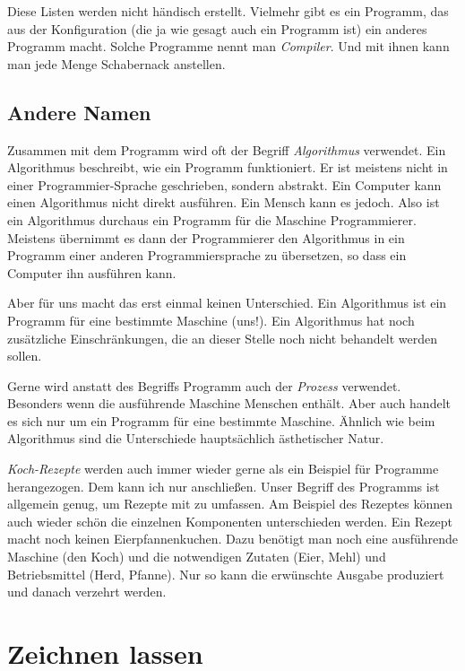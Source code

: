 \documentclass[a5paper,ngerman,9pt]{article}
\begin{document}
\begin{multicols}{2}
	Diese Listen werden nicht händisch erstellt.
	Vielmehr gibt es ein Programm, das aus der Konfiguration (die ja wie
	gesagt auch ein Programm ist) ein anderes Programm macht.
	Solche Programme nennt man \emph{Compiler}.
	Und mit ihnen kann man jede Menge Schabernack anstellen.

	\subsection{Andere Namen}

	Zusammen mit dem Programm wird oft der Begriff \emph{Algorithmus}
	verwendet.
	Ein Algorithmus beschreibt, wie ein Programm funktioniert.
	Er ist meistens nicht in einer Programmier-Sprache geschrieben,
	sondern abstrakt.
	Ein Computer kann einen Algorithmus nicht direkt ausführen.
	Ein Mensch kann es jedoch.
	Also ist ein Algorithmus durchaus ein Programm für die Maschine
	Programmierer.
	Meistens übernimmt es dann der Programmierer den Algorithmus in
	ein Programm einer anderen Programmiersprache zu übersetzen, so dass
	ein Computer ihn ausführen kann.

	Aber für uns macht das erst einmal keinen Unterschied.
	Ein Algorithmus ist ein Programm für eine bestimmte Maschine (uns!).
	Ein Algorithmus hat noch zusätzliche Einschränkungen, die an dieser
	Stelle noch nicht behandelt werden sollen.

	Gerne wird anstatt des Begriffs Programm auch der \emph{Prozess}
	verwendet.
	Besonders wenn die ausführende Maschine Menschen enthält.
	Aber auch handelt es sich nur um ein Programm für eine bestimmte
	Maschine.
	Ähnlich wie beim Algorithmus sind die Unterschiede hauptsächlich
	ästhetischer Natur.

	\emph{Koch-Rezepte} werden auch immer wieder gerne als ein Beispiel
	für Programme herangezogen.
	Dem kann ich nur anschließen.
	Unser Begriff des Programms ist allgemein genug, um Rezepte mit zu
	umfassen.
	Am Beispiel des Rezeptes können auch wieder schön die einzelnen
	Komponenten unterschieden werden.
	Ein Rezept macht noch keinen Eierpfannenkuchen.
	Dazu benötigt man noch eine ausführende Maschine (den Koch) und
	die notwendigen Zutaten (Eier, Mehl) und Betriebsmittel
	(Herd, Pfanne).
	Nur so kann die erwünschte Ausgabe produziert und danach verzehrt
	werden.
\end{multicols}

\section{Zeichnen lassen}
\end{document}
